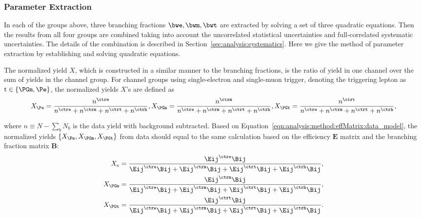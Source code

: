 




\subsubsection{Parameter Extraction}


In each of the groups above, three branching fractions $\bwe,\bwm,\bwt$ are extracted by solving a set of three quadratic equations. Then the results from all four groups are combined taking into account the uncorrelated statistical uncertainties and full-correlated systematic uncertainties. The details of the combination is described in Section~\ref{sec:analysis:systematics}. Here we give the method of parameter extraction by establishing and solving quadratic equations.


The normalized yield $X$, which is constructed in a similar manner to the branching fractions, is the ratio of yield in one channel over the sum of yields in the channel group. For channel groups using single-electron and single-muon trigger, denoting the triggering lepton as $\mathrm{t} \in \{\PGm, \Pe\}$, the normalized yields $X$'s are defined as
\begin{equation}
    X_\Pe   = \frac{n^{\ctre}  }{n^{\ctre} + n^{\ctrm} + n^{\ctrt} + n^{\ctrh}},
    X_\PGm  = \frac{n^{\ctrm}  }{n^{\ctre} + n^{\ctrm} + n^{\ctrt} + n^{\ctrh}}, 
    X_\PGt  = \frac{n^{\ctrt}  }{n^{\ctre} + n^{\ctrm} + n^{\ctrt} + n^{\ctrh}},
\end{equation}

\noindent where $n \equiv N - \sum_{b} N_b $ is the data yield with background subtracted. Based on Equation~\ref{eqn:analysis:method:effMatrix:data_model}, the normalized yields $\{X_\Pe,X_\PGm,X_\PGt\}$ from data should equal to the same calculation based on the efficiency $\boldsymbol{E}$ matrix and the branching fraction matrix $\boldsymbol{B}$:
% 
\begin{equation} \label{eqn:analysis:method:counting:quadEqA}
    \begin{split}
    X_e     &= \frac{ \Eij^{\ctre}\Bij }{  \Eij^{\ctre}\Bij+ \Eij^{\ctrm}\Bij+ \Eij^{\ctrt}\Bij+ \Eij^{\ctrh}\Bij} ,\\
    X_\PGm  &= \frac{ \Eij^{\ctrm}\Bij }{  \Eij^{\ctre}\Bij+ \Eij^{\ctrm}\Bij+ \Eij^{\ctrt}\Bij+ \Eij^{\ctrh}\Bij} ,\\
    X_\PGt  &= \frac{ \Eij^{\ctrt}\Bij }{  \Eij^{\ctre}\Bij+ \Eij^{\ctrm}\Bij+ \Eij^{\ctrt}\Bij+ \Eij^{\ctrh}\Bij}.
    \end{split}
\end{equation}


